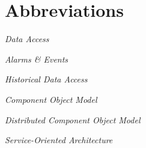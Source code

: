 % 

\chapter*{Abbreviations}
\label{sec:abbreviations}
\noindent\vspace{-\topsep-\partopsep-\parsep} %
\begin{description}[labelwidth=*]
  \item [DA] \emph{Data Access}%
  \item [A\&E] \emph{Alarms \& Events}%
  \item [HDA] \emph{Historical Data Access}%
  \item [COM] \emph{ Component Object Model }%
  \item [DCOM] \emph{Distributed Component Object Model}%
  \item [SOA] \emph{Service-Oriented Architecture}%
\end{description}
